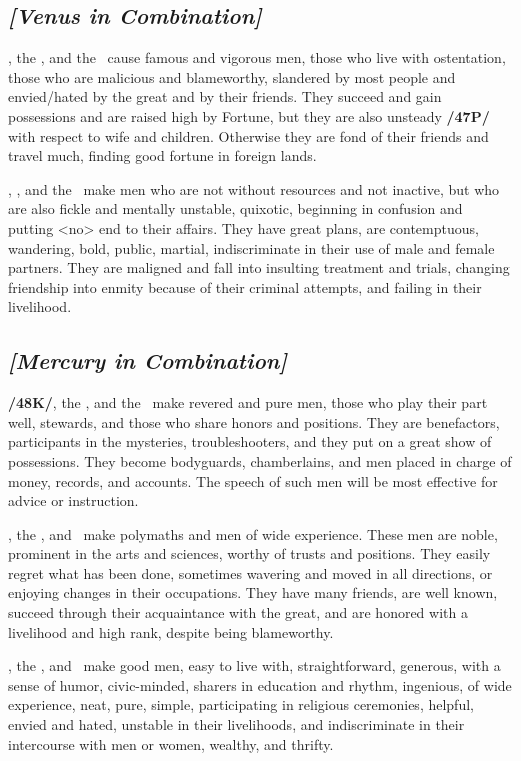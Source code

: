 \subsection{\textit{[Venus in Combination]}}
\Venus, the \Sun, and the \Moon\, cause famous and vigorous men, those who live with ostentation, those who are malicious and blameworthy, slandered by most people and envied/hated by the great and by their friends. They succeed and gain possessions and are raised high by Fortune, but they are also unsteady
\textbf{/47P/} with respect to wife and children. Otherwise they are fond of their friends and travel much, finding
good fortune in foreign lands.

\Venus, \Mars, and the \Moon\, make men who are not without resources and not inactive, but who are also fickle and mentally unstable, quixotic, beginning in confusion and putting <no> end to their affairs. They have great plans, are contemptuous, wandering, bold, public, martial, indiscriminate in their use of male and female partners. They are maligned and fall into insulting treatment and trials, changing friendship into enmity because of their criminal attempts, and failing in their livelihood.

\secbr
{}
\subsection{\textit{[Mercury in Combination]}}
\textbf{/48K/}\Mercury, the \Sun, and the \Moon\, make revered and pure men, those who play their part well, stewards, and those who share honors and positions. They are benefactors, participants in the mysteries, troubleshooters, and they put on a great show of possessions. They become bodyguards, chamberlains, and men placed in charge of money, records, and accounts. The speech of such men will be most effective for advice or instruction.

\Mercury, the \Sun, and \Venus\, make polymaths and men of wide experience. These men are noble, prominent in the arts and sciences, worthy of trusts and positions. They easily regret what has been done, sometimes wavering and moved in all directions, or enjoying changes in their occupations. They have many friends, are well known, succeed through their acquaintance with the great, and are honored with a livelihood and high rank, despite being blameworthy.

\Mercury, the \Moon, and \Venus\, make good men, easy to live with, straightforward, generous, with a sense of humor, civic-minded, sharers in education and rhythm, ingenious, of wide experience, neat, pure, simple, participating in religious ceremonies, helpful, envied and hated, unstable in their livelihoods, and indiscriminate in their intercourse with men or women, wealthy, and thrifty.

